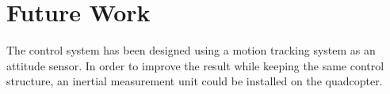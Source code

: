\section{Future Work}
The control system has been designed using a motion tracking system as an attitude sensor. In order to improve the result while keeping the same control structure, an inertial measurement unit could be installed on the quadcopter.  